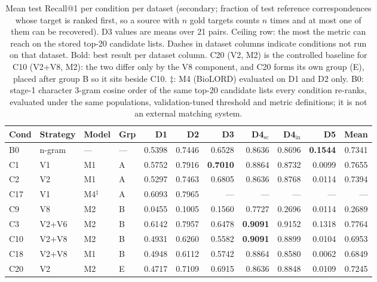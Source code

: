 \begin{table}[t]
\scriptsize
\setlength{\tabcolsep}{4pt}
\begin{threeparttable}
\caption{Mean test Recall@1 per condition per dataset (secondary; fraction of test reference correspondences whose target is ranked first, so a source with $n$ gold targets counts $n$ times and at most one of them can be recovered). D3 values are means over 21 pairs. Ceiling row: the most the metric can reach on the stored top-20 candidate lists. Dashes in dataset columns indicate conditions not run on that dataset. Bold: best result per dataset column. C20 (V2, M2) is the controlled baseline for C10 (V2+V8, M2): the two differ only by the V8 component, and C20 forms its own group (E), placed after group B so it sits beside C10. $\ddagger$: M4 (BioLORD) evaluated on D1 and D2 only. B0: stage-1 character 3-gram cosine order of the same top-20 candidate lists every condition re-ranks, evaluated under the same populations, validation-tuned threshold and metric definitions; it is not an external matching system.}
\label{tab:ranking_recall_at_1}
\begin{tabular}{llllrrrrrrr}
\hline
\textbf{Cond} & \textbf{Strategy} & \textbf{Model} & \textbf{Grp} & \textbf{D1} & \textbf{D2} & \textbf{D3} & \textbf{D4$_{\mathrm{sc}}$} & \textbf{D4$_{\mathrm{in}}$} & \textbf{D5} & \textbf{Mean\tnote{*}} \\
\hline
B0 & n-gram & --- & --- & 0.5398 & 0.7446 & 0.6528 & 0.8636 & 0.8696 & \textbf{0.1544} & 0.7341 \\
\hline
C1 & V1 & M1 & A & 0.5752 & 0.7916 & \textbf{0.7010} & 0.8864 & 0.8732 & 0.0099 & 0.7655 \\
C2 & V2 & M1 & A & 0.5297 & 0.7463 & 0.6805 & 0.8636 & 0.8768 & 0.0114 & 0.7394 \\
C17 & V1 & M4$^\ddagger$ & A & 0.6093 & 0.7965 & --- & --- & --- & --- & --- \\
\hline
C9 & V8 & M2 & B & 0.0455 & 0.1005 & 0.1560 & 0.7727 & 0.2696 & 0.0114 & 0.2689 \\
C3 & V2+V6 & M2 & B & 0.6142 & 0.7957 & 0.6478 & \textbf{0.9091} & 0.9152 & 0.1318 & 0.7764 \\
C10 & V2+V8 & M2 & B & 0.4931 & 0.6260 & 0.5582 & \textbf{0.9091} & 0.8899 & 0.0104 & 0.6953 \\
C18 & V2+V8 & M1 & B & 0.4948 & 0.6112 & 0.5742 & 0.8864 & 0.8580 & 0.0062 & 0.6849 \\
\hline
C20 & V2 & M2 & E & 0.4717 & 0.7109 & 0.6915 & 0.8636 & 0.8848 & 0.0109 & 0.7245 \\

\end{tabular}
\end{threeparttable}
\end{table}
